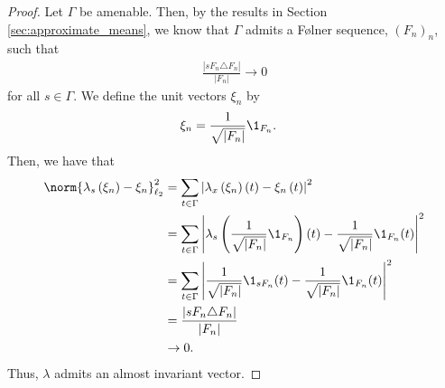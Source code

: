 \begin{proof}
  Let $\Gamma$ be amenable. Then, by the results in Section \ref{sec:approximate_means}, we know that $\Gamma$ admits a Følner sequence, $\left( F_n \right)_{n}$, such that
  \begin{align*}
    \frac{\left\vert sF_n\triangle F_n \right\vert}{\left\vert F_n \right\vert} \rightarrow 0
  \end{align*}
  for all $s\in\Gamma$. We define the unit vectors $\xi_n$ by
  \begin{align*}
    \xi_n &= \frac{1}{\sqrt{\left\vert F_n \right\vert}} \1_{F_n}.
  \end{align*}
  Then, we have that
  \begin{align*}
    \norm{\lambda_s\left( \xi_n \right) - \xi_n}_{\ell_2}^2 &= \sum_{t\in\Gamma}\left\vert \lambda_x\left( \xi_n \right)\left( t \right) - \xi_n\left( t \right) \right\vert^2\\
                                                            &= \sum_{t\in\Gamma}\left\vert \lambda_s\left( \frac{1}{\sqrt{\left\vert F_n \right\vert}}\1_{F_n} \right)(t) - \frac{1}{\sqrt{\left\vert F_n \right\vert}}\1_{F_n}(t) \right\vert^2\\
                                                            &= \sum_{t\in\Gamma}\left\vert \frac{1}{\sqrt{\left\vert F_n \right\vert}}\1_{sF_n}(t) - \frac{1}{\sqrt{\left\vert F_n \right\vert}}\1_{F_n}(t) \right\vert^2\\
                                                            &= \frac{\left\vert sF_n\triangle F_n \right\vert}{\left\vert F_n \right\vert}\\
                                                            &\rightarrow 0.
  \end{align*}
  Thus, $\lambda$ admits an almost invariant vector.\newline


\end{proof}
